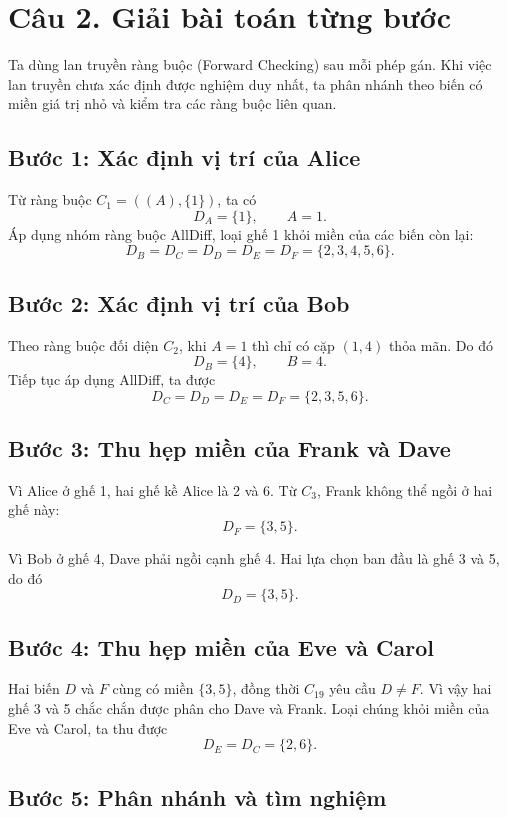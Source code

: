 \section{Câu 2. Giải bài toán từng bước}

Ta dùng lan truyền ràng buộc (Forward Checking) sau mỗi phép gán. Khi việc
lan truyền chưa xác định được nghiệm duy nhất, ta phân nhánh theo biến có
miền giá trị nhỏ và kiểm tra các ràng buộc liên quan.

\subsection{Bước 1: Xác định vị trí của Alice}

Từ ràng buộc $C_1=((A),\{1\})$, ta có
\[
    D_A=\{1\},\qquad A=1.
\]
Áp dụng nhóm ràng buộc AllDiff, loại ghế 1 khỏi miền của các biến còn lại:
\[
    D_B=D_C=D_D=D_E=D_F=\{2,3,4,5,6\}.
\]

\subsection{Bước 2: Xác định vị trí của Bob}

Theo ràng buộc đối diện $C_2$, khi $A=1$ thì chỉ có cặp $(1,4)$ thỏa mãn.
Do đó
\[
    D_B=\{4\},\qquad B=4.
\]
Tiếp tục áp dụng AllDiff, ta được
\[
    D_C=D_D=D_E=D_F=\{2,3,5,6\}.
\]

\subsection{Bước 3: Thu hẹp miền của Frank và Dave}

Vì Alice ở ghế 1, hai ghế kề Alice là 2 và 6. Từ $C_3$, Frank không thể
ngồi ở hai ghế này:
\[
    D_F=\{3,5\}.
\]

Vì Bob ở ghế 4, Dave phải ngồi cạnh ghế 4. Hai lựa chọn ban đầu là ghế 3
và 5, do đó
\[
    D_D=\{3,5\}.
\]

\subsection{Bước 4: Thu hẹp miền của Eve và Carol}

Hai biến $D$ và $F$ cùng có miền $\{3,5\}$, đồng thời $C_{19}$ yêu cầu
$D\ne F$. Vì vậy hai ghế 3 và 5 chắc chắn được phân cho Dave và Frank.
Loại chúng khỏi miền của Eve và Carol, ta thu được
\[
    D_E=D_C=\{2,6\}.
\]

\subsection{Bước 5: Phân nhánh và tìm nghiệm}

